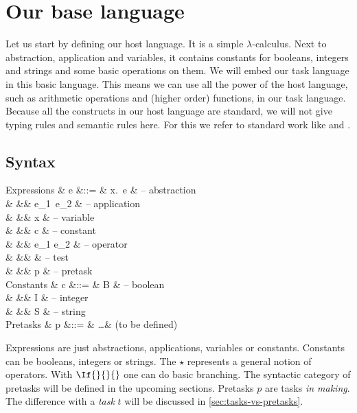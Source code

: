 
\section{Our base language}

Let us start by defining our host language.
It is a simple $\lambda$-calculus.
Next to abstraction, application and variables,
it contains constants for booleans, integers and strings
and some basic operations on them.
We will embed our task language in this basic language.
This means we can use all the power of the host language,
such as arithmetic operations and (higher order) functions,
in our task language.
Because all the constructs in our host language are standard,
we will not give typing rules and semantic rules here.
For this we refer to standard work like \textcite{books/Pierce02TAPL} and \textcite{books/Harper16PFPL}.


\subsection{Syntax}
\label{sec:syntax}

\begin{grammar}
  Expressions
    & e &::= & \lambda x.\ e      & – abstraction \\
    &   &\mid& e_1\ e_2           & – application \\
    &   &\mid& x                  & – variable \\
    &   &\mid& c                  & – constant \\
    &   &\mid& e_1 \star e_2      & – operator \\
    &   &\mid&  & – test \\
    &   &\mid& p                  & – pretask \\
  Constants
    & c &::= & B                  & – boolean \\
    &   &\mid& I                  & – integer \\
    &   &\mid& S                  & – string \\
  Pretasks
    & p &::= & \ldots             & (to be defined) \\
\end{grammar}
Expressions are just abstractions, applications, variables or constants.
Constants can be booleans, integers or strings.
The $\star$ represents a general notion of operators.
With $\If{}{}{}$ one can do basic branching.
The syntactic category of pretasks will be defined in the upcoming sections.
Pretasks $p$ are tasks \emph{in making}.
The difference with a \emph{task} $t$ will be discussed in \autoref{sec:tasks-vs-pretasks}.

